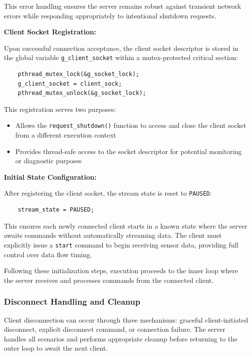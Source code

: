 This error handling ensures the server remains robust against transient network errors while responding appropriately to intentional shutdown requests.

\textbf{Client Socket Registration:}

Upon successful connection acceptance, the client socket descriptor is stored in the global variable \texttt{g\_client\_socket} within a mutex-protected critical section:

\begin{verbatim}
	pthread_mutex_lock(&g_socket_lock);
	g_client_socket = client_sock;
	pthread_mutex_unlock(&g_socket_lock);
\end{verbatim}

This registration serves two purposes:
\begin{itemize}
	\item Allows the \texttt{request\_shutdown()} function to access and close the client socket from a different execution context
	\item Provides thread-safe access to the socket descriptor for potential monitoring or diagnostic purposes
\end{itemize}

\textbf{Initial State Configuration:}

After registering the client socket, the stream state is reset to \texttt{PAUSED}:

\begin{verbatim}
	stream_state = PAUSED;
\end{verbatim}

This ensures each newly connected client starts in a known state where the server awaits commands without automatically streaming data. The client must explicitly issue a \texttt{start} command to begin receiving sensor data, providing full control over data flow timing.

Following these initialization steps, execution proceeds to the inner loop where the server receives and processes commands from the connected client.

\subsubsection{Disconnect Handling and Cleanup}

Client disconnection can occur through three mechanisms: graceful client-initiated disconnect, explicit disconnect command, or connection failure. The server handles all scenarios and performs appropriate cleanup before returning to the outer loop to await the next client.

